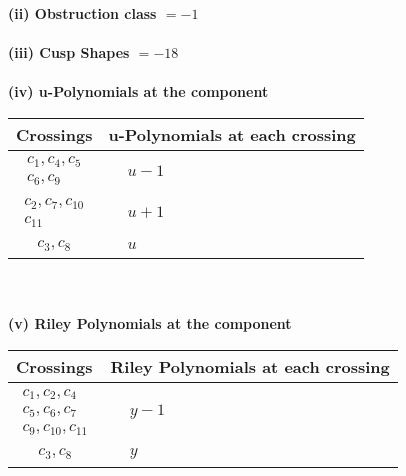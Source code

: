 \documentclass[1p]{elsarticle_modified}
\theoremstyle{definition}
\begin{document}
\flushleft \textbf{(ii) Obstruction class $= -1$}\\~\\
\flushleft \textbf{(iii) Cusp Shapes $= -18$}\\~\\
\newpage\renewcommand{\arraystretch}{1}
\flushleft \textbf{(iv) u-Polynomials at the component}\newline \\
\begin{tabular}{m{50pt}|m{274pt}}
Crossings & \hspace{64pt}u-Polynomials at each crossing \\
\hline $$\begin{aligned}c_{1},c_{4},c_{5}\\c_{6},c_{9}\end{aligned}$$&$\begin{aligned}
&u-1
\end{aligned}$\\
\hline $$\begin{aligned}c_{2},c_{7},c_{10}\\c_{11}\end{aligned}$$&$\begin{aligned}
&u+1
\end{aligned}$\\
\hline $$\begin{aligned}c_{3},c_{8}\end{aligned}$$&$\begin{aligned}
&u
\end{aligned}$\\
\hline
\end{tabular}\\~\\
\newpage\renewcommand{\arraystretch}{1}
\flushleft \textbf{(v) Riley Polynomials at the component}\newline \\
\begin{tabular}{m{50pt}|m{274pt}}
Crossings & \hspace{64pt}Riley Polynomials at each crossing \\
\hline $$\begin{aligned}c_{1},c_{2},c_{4}\\c_{5},c_{6},c_{7}\\c_{9},c_{10},c_{11}\end{aligned}$$&$\begin{aligned}
&y-1
\end{aligned}$\\
\hline $$\begin{aligned}c_{3},c_{8}\end{aligned}$$&$\begin{aligned}
&y
\end{aligned}$\\
\hline
\end{tabular}\\~\\
\end{document}
